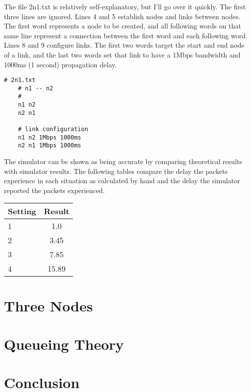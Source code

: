 \documentclass[11pt]{article}
\begin{document}
The file 2n1.txt is relatively self-explanatory, but I'll go over it quickly. The first three lines are ignored. Lines 4 and 5 establish nodes and links between nodes. The first word represents a node to be created, and all following words on that same line represent a connection between the first word and each following word. Lines 8 and 9 configure links. The first two words target the start and end node of a link, and the last two words set that link to have a 1Mbps bandwidth and 1000ms (1 second) propagation delay.

\begin{lstlisting}
# 2n1.txt
    # n1 -- n2
    #
    n1 n2
    n2 n1

    # link configuration
    n1 n2 1Mbps 1000ms
    n2 n1 1Mbps 1000ms
\end{lstlisting}

The simulator can be shown as being accurate by comparing theoretical results with simulator results. The following tables compare the delay the packets experience in each situation as calculated by hand and the delay the simulator reported the packets experienced.

\vspace{0.5cm}
\begin{tabular}{lc}
  \toprule
  Setting & Result\\
  \midrule
  1 & 1.0\\
  2 & 3.45\\
  3 & 7.85\\
  4 & 15.89\\
  \bottomrule
\end{tabular}
\vspace{0.5cm}

\section{Three Nodes}

\section{Queueing Theory}

\section{Conclusion}
\end{document}
